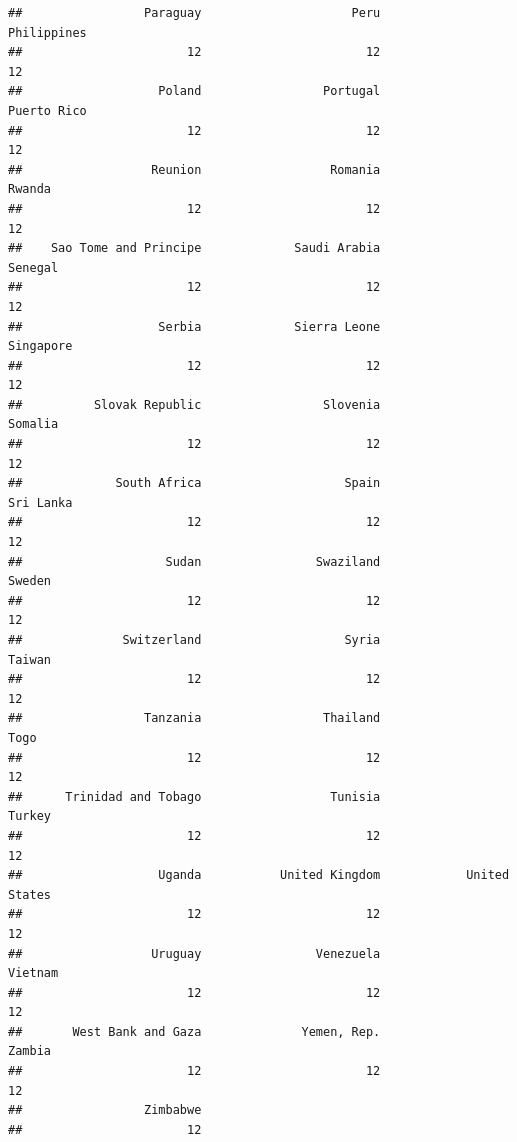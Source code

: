 \documentclass[
]{book}
\newenvironment{Shaded}{\begin{snugshade}}{\end{snugshade}}
\newcommand{\CommentTok}[1]{\textcolor[rgb]{0.56,0.35,0.01}{\textit{#1}}}
\newcommand{\FunctionTok}[1]{\textcolor[rgb]{0.13,0.29,0.53}{\textbf{#1}}}
\newcommand{\NormalTok}[1]{#1}
\newcommand{\SpecialCharTok}[1]{\textcolor[rgb]{0.81,0.36,0.00}{\textbf{#1}}}
\begin{document}
\begin{verbatim}
##                 Paraguay                     Peru              Philippines 
##                       12                       12                       12 
##                   Poland                 Portugal              Puerto Rico 
##                       12                       12                       12 
##                  Reunion                  Romania                   Rwanda 
##                       12                       12                       12 
##    Sao Tome and Principe             Saudi Arabia                  Senegal 
##                       12                       12                       12 
##                   Serbia             Sierra Leone                Singapore 
##                       12                       12                       12 
##          Slovak Republic                 Slovenia                  Somalia 
##                       12                       12                       12 
##             South Africa                    Spain                Sri Lanka 
##                       12                       12                       12 
##                    Sudan                Swaziland                   Sweden 
##                       12                       12                       12 
##              Switzerland                    Syria                   Taiwan 
##                       12                       12                       12 
##                 Tanzania                 Thailand                     Togo 
##                       12                       12                       12 
##      Trinidad and Tobago                  Tunisia                   Turkey 
##                       12                       12                       12 
##                   Uganda           United Kingdom            United States 
##                       12                       12                       12 
##                  Uruguay                Venezuela                  Vietnam 
##                       12                       12                       12 
##       West Bank and Gaza              Yemen, Rep.                   Zambia 
##                       12                       12                       12 
##                 Zimbabwe 
##                       12
\end{verbatim}

\begin{Shaded}
\end{Shaded}
\end{document}
